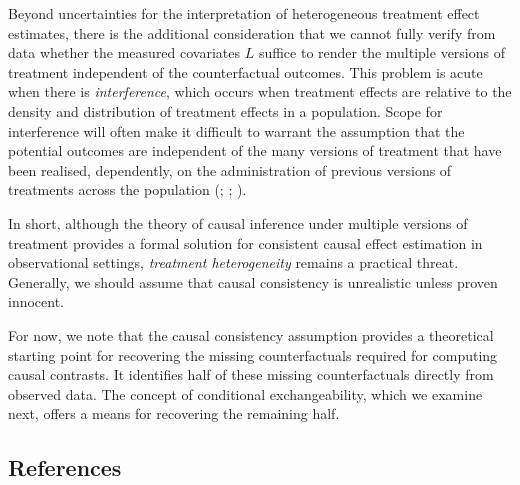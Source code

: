 \documentclass[
  single column]{article}
\begin{document}
Beyond uncertainties for the interpretation of heterogeneous treatment
effect estimates, there is the additional consideration that we cannot
fully verify from data whether the measured covariates \(L\) suffice to
render the multiple versions of treatment independent of the
counterfactual outcomes. This problem is acute when there is
\emph{interference}, which occurs when treatment effects are relative to
the density and distribution of treatment effects in a population. Scope
for interference will often make it difficult to warrant the assumption
that the potential outcomes are independent of the many versions of
treatment that have been realised, dependently, on the administration of
previous versions of treatments across the population
(;
;
).

In short, although the theory of causal inference under multiple
versions of treatment provides a formal solution for consistent causal
effect estimation in observational settings, \emph{treatment
heterogeneity} remains a practical threat. Generally, we should assume
that causal consistency is unrealistic unless proven innocent.

For now, we note that the causal consistency assumption provides a
theoretical starting point for recovering the missing counterfactuals
required for computing causal contrasts. It identifies half of these
missing counterfactuals directly from observed data. The concept of
conditional exchangeability, which we examine next, offers a means for
recovering the remaining half.

\newpage{}

\subsection{References}\label{references}
\end{document}
